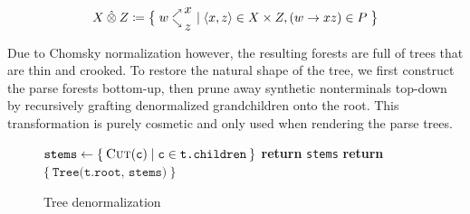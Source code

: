 \documentclass[sigplan,review,anonymous,acmsmall]{acmart}\settopmatter{printfolios=false,printccs=false,printacmref=false}
\begin{document}
\begin{align}
  X\:\hat{\otimes}\:Z \coloneqq \big\{\;w\hphantom{.}^{\nearrow}_{\searrow}\nobarfrac{x}{z} \mid \langle x, z\rangle \in X \times Z, (w\rightarrow xz) \in P\;\big\}
\end{align}

Due to Chomsky normalization however, the resulting forests are full of trees that are thin and crooked. To restore the natural shape of the tree, we first construct the parse forests bottom-up, then prune away synthetic nonterminals top-down by recursively grafting denormalized grandchildren onto the root. This transformation is purely cosmetic and only used when rendering the parse trees.

\begin{figure}[H]
  \begin{minipage}{.45\linewidth}
    \begin{algorithm}[H]
      \caption{Tree denormalization}\label{alg:cap}
      \begin{algorithmic}
          \State $\texttt{stems} \leftarrow \{\:\textsc{Cut}(\texttt{c}) \mid \texttt{c} \in \texttt{t.children}\:\}$
            \State \textbf{return } \texttt{stems} %
          \Else%
            \State \textbf{return } $\{\:\texttt{Tree(t.root, stems)}\:\}$
          \EndIf
        \EndProcedure
      \end{algorithmic}
    \end{algorithm}
  \end{minipage}
\end{figure}
\end{document}
